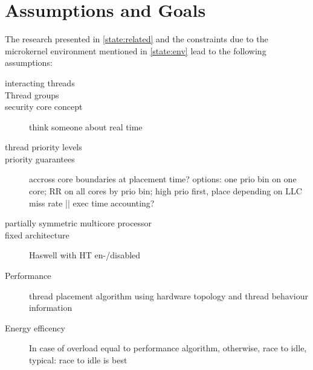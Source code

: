 \section{Assumptions and Goals}
\label{design:assump}

The research presented in \ref{state:related} and the constraints due to
the microkernel environment mentioned in \ref{state:env} lead to the following
assumptions:

\begin{description}
  \item[interacting threads]
  \item[Thread groups]
  \item[security core concept] think someone about real time
  \item[thread priority levels]
  \item[priority guarantees] accross core boundaries at placement time?
    options: one prio bin on one core; RR on all cores by prio bin; high prio
    first, place depending on LLC miss rate || exec time accounting?
  \item[]
  \item[partially symmetric multicore processor]
  \item[fixed architecture] Haswell with HT en-/disabled
  \item[Performance] thread placement algorithm using hardware topology and
    thread behaviour information
  \item[Energy efficency] In case of overload equal to performance algorithm,
    otherwise, race to idle, typical: race to idle is best
\end{description}


